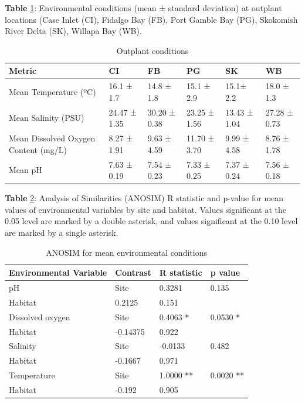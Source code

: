 \documentclass [11pt, proquest] {uwthesis}[2015/03/03]
\begin{document}
\textbf{Table} \ref{tab:outplantenv}: Environmental conditions (mean ± standard deviation) at outplant locations (Case Inlet (CI), Fidalgo Bay (FB), Port Gamble Bay (PG), Skokomish River Delta (SK), Willapa Bay (WB).

\begingroup\fontsize{8}{10}\selectfont
\begin{longtable}[t]{llllll}
\caption{\label{tab:outplantenv}Outplant conditions}\\
\toprule
Metric & CI & FB & PG & SK & WB\\
\midrule
Mean Temperature (ºC) & 16.1 ± 1.7 & 14.8 ± 1.8 & 15.1 ± 2.9 & 15.1± 2.2 & 18.0 ± 1.3\\
Mean Salinity (PSU) & 24.47 ± 1.35 & 30.20 ± 0.38 & 23.25 ± 1.56 & 13.43 ± 1.04 & 27.28 ± 0.73\\
Mean Dissolved Oxygen Content (mg/L) & 8.27 ± 1.91 & 9.63 ± 4.59 & 11.70 ± 3.70 & 9.99 ± 4.58 & 8.76 ± 1.78\\
Mean pH & 7.63 ± 0.19 & 7.54 ± 0.23 & 7.33 ± 0.25 & 7.37 ± 0.24 & 7.56 ± 0.18\\
\bottomrule
\end{longtable}
\endgroup{}
\clearpage

\textbf{Table} \ref{tab:envmeans}: Analysis of Similarities (ANOSIM) R statistic and p-value for mean values of environmental variables by site and habitat. Values significant at the 0.05 level are marked by a double asterisk, and values significant at the 0.10 level are marked by a single asterisk.

\begingroup\fontsize{10}{12}\selectfont
\begin{longtable}[t]{llll}
\caption{\label{tab:envmeans}ANOSIM for mean environmental conditions}\\
\toprule
Environmental Variable & Contrast & R statistic & p value\\
\midrule
pH & Site & 0.3281 & 0.135\\
Habitat & 0.2125 & 0.151 & \\
Dissolved oxygen & Site & 0.4063 * & 0.0530 *\\
Habitat & -0.14375 & 0.922 & \\
Salinity & Site & -0.0133 & 0.482\\
\addlinespace
Habitat & -0.1667 & 0.971 & \\
Temperature & Site & 1.0000 ** & 0.0020 **\\
Habitat & -0.192 & 0.905 & \\
\bottomrule
\end{longtable}
\endgroup{}
\clearpage
\end{document}
